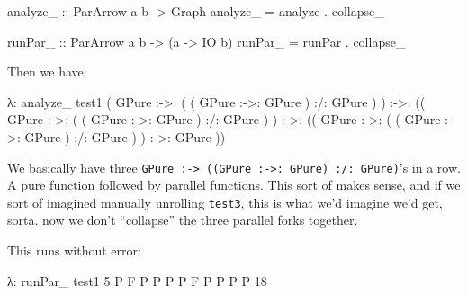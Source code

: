 \documentclass[]{article}
\newenvironment{Shaded}{}{}
\newcommand{\DataTypeTok}[1]{\textcolor[rgb]{0.56,0.13,0.00}{#1}}
\newcommand{\DecValTok}[1]{\textcolor[rgb]{0.25,0.63,0.44}{#1}}
\newcommand{\NormalTok}[1]{#1}
\newcommand{\OperatorTok}[1]{\textcolor[rgb]{0.40,0.40,0.40}{#1}}
\newcommand{\OtherTok}[1]{\textcolor[rgb]{0.00,0.44,0.13}{#1}}
\begin{document}
\begin{Shaded}
\begin{Highlighting}[]
\OtherTok{analyze\_ ::} \DataTypeTok{ParArrow}\NormalTok{ a b }\OtherTok{{-}\textgreater{}} \DataTypeTok{Graph}
\NormalTok{analyze\_ }\OtherTok{=}\NormalTok{ analyze\textquotesingle{} }\OperatorTok{.}\NormalTok{ collapse\_}

\OtherTok{runPar\_ ::} \DataTypeTok{ParArrow}\NormalTok{ a b }\OtherTok{{-}\textgreater{}}\NormalTok{ (a }\OtherTok{{-}\textgreater{}} \DataTypeTok{IO}\NormalTok{ b)}
\NormalTok{runPar\_ }\OtherTok{=}\NormalTok{ runPar\textquotesingle{} }\OperatorTok{.}\NormalTok{ collapse\_}
\end{Highlighting}
\end{Shaded}

Then we have:

\begin{Shaded}
\begin{Highlighting}[]
\NormalTok{λ}\OperatorTok{:}\NormalTok{ analyze\_ test1}
\NormalTok{(}
  \DataTypeTok{GPure} \OperatorTok{:{-}\textgreater{}:}\NormalTok{ ( ( }\DataTypeTok{GPure} \OperatorTok{:{-}\textgreater{}:} \DataTypeTok{GPure}\NormalTok{ ) }\OperatorTok{:/:} \DataTypeTok{GPure}\NormalTok{ )}
\NormalTok{) }\OperatorTok{:{-}\textgreater{}:}\NormalTok{ ((}
  \DataTypeTok{GPure} \OperatorTok{:{-}\textgreater{}:}\NormalTok{ ( ( }\DataTypeTok{GPure} \OperatorTok{:{-}\textgreater{}:} \DataTypeTok{GPure}\NormalTok{ ) }\OperatorTok{:/:} \DataTypeTok{GPure}\NormalTok{ )}
\NormalTok{) }\OperatorTok{:{-}\textgreater{}:}\NormalTok{ ((}
  \DataTypeTok{GPure} \OperatorTok{:{-}\textgreater{}:}\NormalTok{ ( ( }\DataTypeTok{GPure} \OperatorTok{:{-}\textgreater{}:} \DataTypeTok{GPure}\NormalTok{ ) }\OperatorTok{:/:} \DataTypeTok{GPure}\NormalTok{ )}
\NormalTok{) }\OperatorTok{:{-}\textgreater{}:}
  \DataTypeTok{GPure}
\NormalTok{))}
\end{Highlighting}
\end{Shaded}

We basically have three
\texttt{GPure\ :-\textgreater{}\ ((GPure\ :-\textgreater{}:\ GPure)\ :/:\ GPure)}'s
in a row. A pure function followed by parallel functions. This sort of makes
sense, and if we sort of imagined manually unrolling \texttt{test3}, this is
what we'd imagine we'd get, sorta. now we don't ``collapse'' the three parallel
forks together.

This runs without error:

\begin{Shaded}
\begin{Highlighting}[]
\NormalTok{λ}\OperatorTok{:}\NormalTok{ runPar\_ test1 }\DecValTok{5}
\DataTypeTok{P}
\DataTypeTok{F}
\DataTypeTok{P}
\DataTypeTok{P}
\DataTypeTok{P}
\DataTypeTok{P}
\DataTypeTok{F}
\DataTypeTok{P}
\DataTypeTok{P}
\DataTypeTok{P}
\DataTypeTok{P}
\DecValTok{18}
\end{Highlighting}
\end{Shaded}
\end{document}
